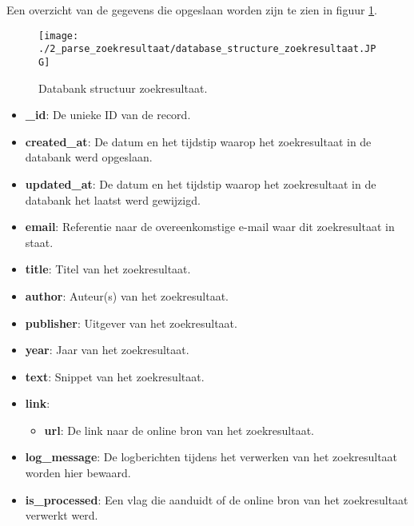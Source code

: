 Een overzicht van de gegevens die opgeslaan worden zijn te zien in figuur \ref{fig:databank_structuur_zoekresultaat}.
\begin{figure}
    \centering
    \texttt{[image: ./2\_parse\_zoekresultaat/database\_structure\_zoekresultaat.JPG]}
    \caption[Databank structuur zoekresultaat.]{\label{fig:databank_structuur_zoekresultaat}Databank structuur zoekresultaat.}
\end{figure}
\begin{itemize}
    \item \textbf{\_id}: De unieke ID van de record.
    \item \textbf{created\_at}: De datum en het tijdstip waarop het zoekresultaat in de databank werd opgeslaan.
    \item \textbf{updated\_at}: De datum en het tijdstip waarop het zoekresultaat in de databank het laatst werd gewijzigd. 
    \item \textbf{email}: Referentie naar de overeenkomstige e-mail waar dit zoekresultaat in staat.
    \item \textbf{title}: Titel van het zoekresultaat.
    \item \textbf{author}: Auteur(s) van het zoekresultaat. 
    \item \textbf{publisher}: Uitgever van het zoekresultaat.
    \item \textbf{year}: Jaar van het zoekresultaat.
    \item \textbf{text}: Snippet van het zoekresultaat.
    \item \textbf{link}: 
    \begin{itemize}
        \item \textbf{url}: De link naar de online bron van het zoekresultaat.
    \end{itemize}
    \item \textbf{log\_message}: De logberichten tijdens het verwerken van het zoekresultaat worden hier bewaard. 
    \item \textbf{is\_processed}: Een vlag die aanduidt of de online bron van het zoekresultaat verwerkt werd.
\end{itemize}

\FloatBarrier
